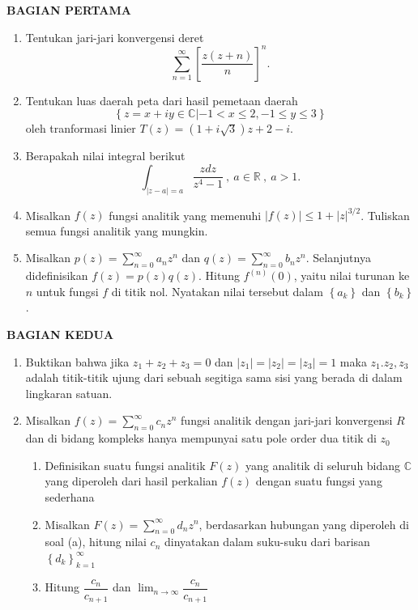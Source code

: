 \documentclass[12pt,twoside]{article}
\begin{document}
\textbf{BAGIAN PERTAMA}
\begin{enumerate}
	\item Tentukan jari-jari konvergensi deret
	      \begin{equation*}
		      \sum_{n = 1}^{\infty} \left[ \dfrac{z(z+n)}{n} \right]^n.
	      \end{equation*}

	\item Tentukan luas daerah peta dari hasil pemetaan daerah
	      \begin{equation*}
		      \left\lbrace z = x + iy \in \mathbb{C} | -1 < x \leq 2, -1 \leq y \leq 3 \right\rbrace
	      \end{equation*}
	      oleh tranformasi linier $T(z)=\left(1+i\sqrt{3}\right)z + 2 - i$.

	\item Berapakah nilai integral berikut
	      \begin{equation*}
		      \displaystyle\int_{|z-a| = a}^{} \dfrac{zdz}{z^4-1}~,~ a\in \mathbb{R}~,~ a>1.
	      \end{equation*}

	\item Misalkan $f(z)$ fungsi analitik yang memenuhi $|f(z)| \leq 1 + |z|^{3/2}$. Tuliskan semua fungsi analitik yang mungkin.

	\item Misalkan $p(z) = \sum_{n=0}^{\infty} a_nz^n$ dan $q(z) = \sum_{n=0}^{\infty} b_nz^n$. Selanjutnya didefinisikan $f(z)=p(z)q(z)$. Hitung $f^{(n)}(0)$, yaitu nilai turunan ke $n$ untuk fungsi $f$ di titik nol. Nyatakan nilai tersebut dalam $\left\lbrace a_k \right\rbrace $ dan $\left\lbrace b_k \right\rbrace$.

\end{enumerate}

\newpage \textbf{BAGIAN KEDUA}
\begin{enumerate}
	\item Buktikan bahwa jika $z_1 + z_2 +z_3 = 0$ dan $|z_1|=|z_2|=|z_3|=1$ maka $z_1. z_2, z_3$ adalah titik-titik ujung dari sebuah segitiga sama sisi yang berada di dalam lingkaran satuan.

	\item Misalkan $f(z) = \sum_{n = 0}^{\infty} c_nz^n$ fungsi analitik dengan jari-jari konvergensi $R$ dan di bidang kompleks hanya mempunyai satu pole order dua titik di $z_0$
	      \begin{enumerate}
		      \item Definisikan suatu fungsi analitik $F(z)$ yang analitik di seluruh bidang $\mathbb{C}$ yang diperoleh dari hasil perkalian $f(z)$ dengan suatu fungsi yang sederhana

		      \item Misalkan $F(z)=\sum_{n=0}^{\infty} d_nz^n$, berdasarkan hubungan yang diperoleh di soal (a), hitung nilai $c_n$ dinyatakan dalam suku-suku dari barisan $\left\lbrace d_k \right\rbrace_{k=1}^{\infty}$

		      \item Hitung $\dfrac{c_n}{c_{n+1}}$ dan $\displaystyle\lim_{n\to\infty} \dfrac{c_n}{c_{n+1}}$
	      \end{enumerate}
\end{enumerate}
\end{document}
